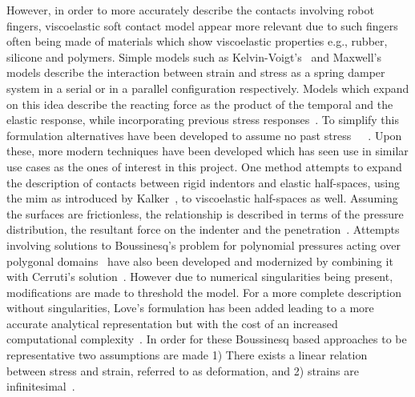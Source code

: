 However, in order to more accurately describe the contacts involving robot fingers, viscoelastic soft contact model appear more relevant due to such fingers often being made of materials which show viscoelastic properties e.g., rubber, silicone and polymers. Simple models such as  Kelvin-Voigt's~\cite{viscoelasticity} and Maxwell's~\cite{on-the-dynamical-theory-of-gases} models describe the interaction between strain and stress as a spring damper system in a serial or in a parallel configuration respectively. Models which expand on this idea describe the reacting force as the product of the temporal and the elastic response, while incorporating previous stress responses~\cite{mechanical-properties-and-active-remodeling-of-blood-vessels}. To simplify this formulation alternatives have been developed to assume no past stress~\cite{modeling-of-viscoelastic-contacts-and-evolution-of-limit-surface-for-robotic-contact-interface}~\cite{characteristics-of-contact-and-limit-surface-for-viscoelastic-fingers}~\cite{effect-of-layer-compliance-on-frictional-behavior-of-soft-robotic-fingers}. Upon these, more modern techniques have been developed which has seen use in similar use cases as the ones of interest in this project. 
One method attempts to expand the description of contacts between rigid indentors and elastic half-spaces, using the \gls{mim} as introduced by Kalker~\cite{on-the-contact-problem-in-elastostatics}, to viscoelastic half-spaces as well. Assuming the surfaces are frictionless, the relationship is described in terms of the pressure distribution, the resultant force on the indenter and the penetration~\cite{a-new-algorithm-for-computing-the-indentation-of-a-rigid-body-of-arbitrary-shape-on-a-viscoelastic-half-space}.
Attempts involving solutions to Boussinesq's problem for polynomial pressures acting over polygonal domains~\cite{a-general-approach-to-the-solution-of-boussinesqs-problem-for-polynomial-pressures-acting-over-polygonal-domains} have also been developed and modernized by combining it with Cerruti's solution~\cite{a-boussinesq-cerruti-solution-set-for-constant-and-linear-distribution-of-normal-and-tangential-load-over-a-triangular-area}. However due to numerical singularities being present, modifications are made to threshold the model. For a more complete description without singularities, Love's formulation has been added leading to a more accurate analytical representation but with the cost of an increased computational complexity~\cite{contact-modelling-and-tactile-data-processing-for-robot-skins}. In order for these Boussinesq based approaches to be representative two assumptions are made 1) There exists a linear relation between stress and strain, referred to as deformation, and 2) strains are infinitesimal~\cite[Chapter 6]{the-linearized-theory-of-elasticity}. \medskip

